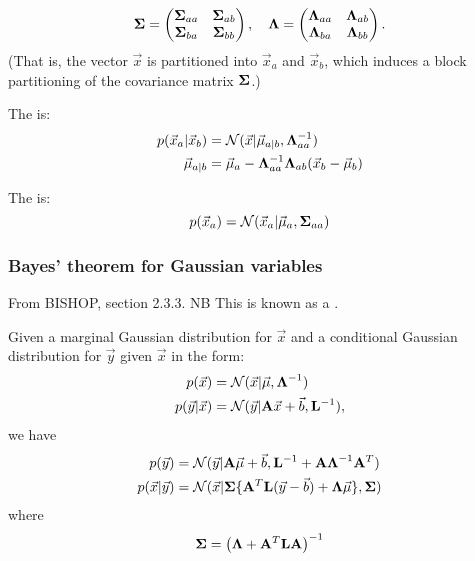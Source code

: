 \documentclass[11pt]{article}
\begin{document}
\begin{appendices}
\begin{equation}
  \boldsymbol{\Sigma} =
  \left(
    \begin{matrix}
      \boldsymbol{\Sigma}_{aa} & \boldsymbol{\Sigma}_{ab} \\
      \boldsymbol{\Sigma}_{ba} & \boldsymbol{\Sigma}_{bb}
    \end{matrix}
  \right)
  , \quad
  \boldsymbol{\Lambda} =
  \left(
    \begin{matrix}
      \boldsymbol{\Lambda}_{aa} & \boldsymbol{\Lambda}_{ab} \\
      \boldsymbol{\Lambda}_{ba} & \boldsymbol{\Lambda}_{bb}
    \end{matrix}
  \right).
\end{equation}
(That is, the vector $\vec{x}$ is partitioned into $\vec{x}_a$ and $\vec{x}_b$, which
induces a block partitioning of the covariance matrix $\boldsymbol{\Sigma}$.)

The  is:
\begin{align}
  p(\vec{x}_a | \vec{x}_b) &= \mathcal{N}(\vec{x} | \vec{\mu}_{a | b},
                              \boldsymbol{\Lambda}_{aa}^{-1}) \\ 
  \vec{\mu}_{a | b}        &= \vec{\mu}_a - \boldsymbol{\Lambda}_{aa}^{-1} \boldsymbol{\Lambda}_{ab}
                              (\vec{x}_b - \vec{\mu}_b) 
\end{align}

The  is:
\begin{equation}
  p(\vec{x}_a) = \mathcal{N}(\vec{x}_a | \vec{\mu}_a, \boldsymbol{\Sigma}_{aa})
\end{equation}

\subsubsection{Bayes' theorem for Gaussian variables}
From BISHOP, section 2.3.3. NB This is known as a .

Given a marginal Gaussian distribution for $\vec{x}$ and a conditional Gaussian
distribution for $\vec{y}$ given $\vec{x}$ in the form:
\begin{align}
  p(\vec{x})         &= \mathcal{N}(\vec{x} | \vec{\mu}, \boldsymbol{\Lambda}^{-1}) \\
  p(\vec{y}|\vec{x}) &= \mathcal{N}(\vec{y} | \mathbf{A} \vec{x} + \vec{b}, \mathbf{L}^{-1}),
\end{align}
we have
\begin{align}
  p(\vec{y})         &= \mathcal{N} (\vec{y} |\mathbf{A} \vec{\mu} + \vec{b}, \mathbf{L}^{-1}
                        + \mathbf{A}\boldsymbol{\Lambda}^{-1} \mathbf{A}^T ) \\
  p(\vec{x}|\vec{y}) &= \mathcal{N} ( \vec{x} | \boldsymbol{\Sigma} \{ \mathbf{A}^T \mathbf{L}
                        (\vec{y} - \vec{b}) + \boldsymbol{\Lambda} \vec{\mu} \}, \boldsymbol{\Sigma})
\end{align}
where
\begin{equation}
  \boldsymbol{\Sigma} = \left(\boldsymbol{\Lambda} + \mathbf{A}^T \mathbf{LA} \right)^{-1}
\end{equation}



\end{appendices}
\end{document}
